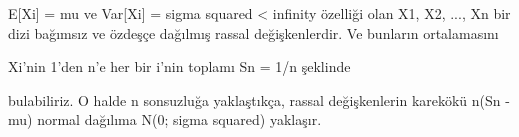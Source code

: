 \documentclass{article}
\begin{document}

E[Xi] = mu ve Var[Xi] = sigma squared < infinity
özelliği olan X1, X2, ..., Xn bir dizi bağımsız ve özdeşçe dağılmış
rassal değişkenlerdir. Ve bunların ortalamasını 

Xi'nin 1'den n'e her bir i'nin toplamı Sn = 1/n şeklinde

bulabiliriz. O halde n sonsuzluğa yaklaştıkça,
rassal değişkenlerin karekökü n(Sn - mu) normal dağılıma 
N(0; sigma squared) yaklaşır. 
\end{document}
